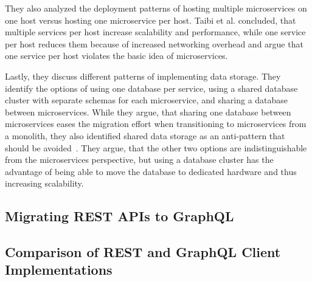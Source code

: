 They also analyzed the deployment patterns of hosting multiple microservices on one host versus hosting one microservice per host.
Taibi et al. concluded, that multiple services per host increase scalability and performance, while one service per host reduces them because of increased networking overhead and argue that one service per host violates the basic idea of microservices.

Lastly, they discuss different patterns of implementing data storage.
They identify the options of using one database per service, using a shared database cluster with separate schemas for each microservice, and sharing a database between microservices.
While they argue, that sharing one database between microservices eases the migration effort when transitioning to microservices from a monolith, they also identified shared data storage as an anti-pattern that should be avoided~\cite{Taibi2020}.
They argue, that the other two options are indistinguishable from the microservices perspective, but using a database cluster has the advantage of being able to move the database to dedicated hardware and thus increasing scalability.

\subsection{Migrating \acs{REST} \acsp{API} to GraphQL}

\cite{Brito2019,Wittern2018,Vogel2017,Lama2019}

\subsection{Comparison of \acs{REST} and GraphQL Client Implementations}

\cite{Brito2020}